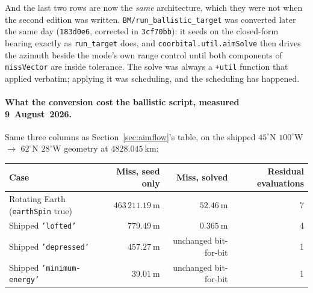 \documentclass[11pt]{article}
\newcommand{\code}[1]{\texttt{#1}}
\newcommand{\pkg}[1]{\texttt{+#1}}
\begin{document}
And the last two rows are now the \emph{same} architecture, which they were not
when the second edition was written. \code{BM/run\_ballistic\_target} was
converted later the same day (\code{183d0e6}, corrected in \code{3cf70bb}): it
seeds on the closed-form bearing exactly as \code{run\_target} does, and
\code{coorbital.util.aimSolve} then drives the azimuth beside the mode's own
range control until both components of \code{missVector} are inside tolerance.
The solve was always a \pkg{util} function that applied verbatim; applying it
was scheduling, and the scheduling has happened.

\paragraph{What the conversion cost the ballistic script, measured
9~August~2026.} Same three columns as Section~\ref{sec:aimflow}'s table, on the
shipped $45^{\circ}$N $100^{\circ}$W $\to$ $62^{\circ}$N $28^{\circ}$W geometry
at $4828.045~\mathrm{km}$:

\begin{center}
\begin{tabular}{lrrr}
\toprule
Case & Miss, seed only & Miss, solved & Residual evaluations \\
\midrule
Rotating Earth (\code{earthSpin} true) & $463\,211.19~\mathrm{m}$ & $52.46~\mathrm{m}$ & 7 \\
Shipped \code{'lofted'}                & $779.49~\mathrm{m}$      & $0.365~\mathrm{m}$  & 4 \\
Shipped \code{'depressed'}             & $457.27~\mathrm{m}$      & unchanged bit-for-bit & 1 \\
Shipped \code{'minimum-energy'}        & $39.01~\mathrm{m}$       & unchanged bit-for-bit & 1 \\
\bottomrule
\end{tabular}
\end{center}
\end{document}
